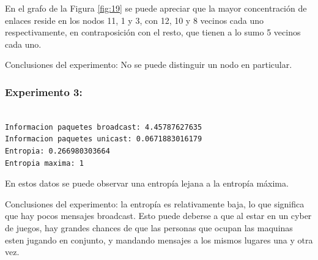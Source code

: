 En el grafo de la Figura \ref{fig:19} se puede apreciar que la mayor concentración de enlaces reside en los nodos 11, 1 y 3, con 12, 10 y 8 vecinos cada uno respectivamente, en contraposición con el resto, que tienen a lo sumo 5 vecinos cada uno.

Conclusiones del experimento: No se puede distinguir un nodo en particular. 

\subsubsection{Experimento 3:}

\begin{verbatim}

Informacion paquetes broadcast: 4.45787627635
Informacion paquetes unicast: 0.0671883016179
Entropia: 0.266980303664
Entropia maxima: 1

\end{verbatim}

En estos datos se puede observar una entropía lejana a la entropía máxima.

Conclusiones del experimento: la entropía es relativamente baja, lo que significa que hay pocos mensajes broadcast. Esto puede deberse a que al estar en un cyber de juegos, hay grandes chances de que las personas que ocupan las maquinas esten jugando en conjunto, y mandando mensajes a los mismos lugares una y otra vez.
